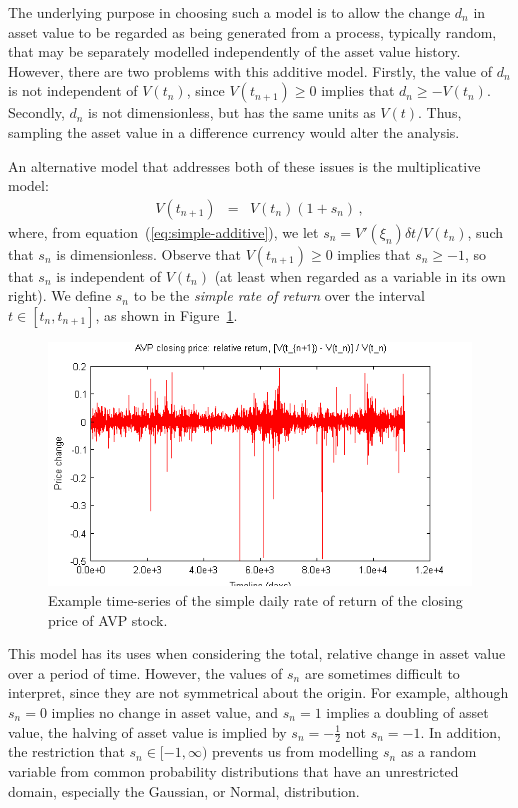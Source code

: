 \documentclass[a4paper]{book}
\begin{document}
The underlying purpose in choosing such a model is to allow 
the change $d_n$ in asset value
to be regarded as being generated from a process, typically random,
 that may be separately modelled independently of the asset value history.
However, there are two problems with this additive model. 
Firstly, the value of $d_n$ is not independent of $V(t_{n})$,
since $V(t_{n+1})\ge 0$ implies that $d_n\ge -V(t_{n})$.
Secondly, $d_n$ is not
dimensionless, but has the same units as $V(t)$. Thus, sampling the
asset value in a difference currency would alter the analysis.

An alternative model that addresses both of these issues is the
multiplicative model:
\begin{eqnarray}
V(t_{n+1})  & = & V(t_{n}) (1+s_n)\,,
\label{eq:rate-of-return}
\end{eqnarray}
where, from equation~(\ref{eq:simple-additive}), we let
$s_n=V'(\xi_n)\delta t/V(t_{n})$, such that
$s_n$ is dimensionless.
Observe that $V(t_{n+1})\ge 0$ implies that
$s_n\ge -1$, so that $s_n$ is independent of $V(t_{n})$
(at least when regarded as a variable in its own right).
We define $s_n$ to be the {\em simple rate of return} over the
interval $t\in[t_{n},t_{n+1}]$, 
as shown in Figure~\ref{fig:avp-price-simple}.
\begin{figure}[hbt]
\includegraphics[scale=0.8]{figures/avp-price-close-simple.png}
\caption{Example time-series of the simple daily rate of return of
the closing price of AVP stock.}
\label{fig:avp-price-simple}
\end{figure}

This model has its uses when considering the total, relative change
in asset value over a period of time.
However, the values of $s_n$ are sometimes difficult to interpret, since they are not symmetrical about the origin. For example,
although $s_n=0$ implies no change in asset value, and $s_n=1$ implies a
doubling of asset value, the halving of asset value is implied by
$s_n=-\frac{1}{2}$ not $s_n=-1$.
In addition, the restriction that $s_n\in[-1,\infty)$ 
prevents us from modelling
$s_n$ as a random variable from common probability distributions that
have an unrestricted domain, especially the Gaussian, or Normal, distribution.
\end{document}
